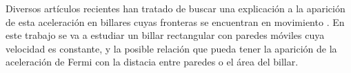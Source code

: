 Diversos artículos recientes han tratado de buscar una explicación a la aparición de esta aceleración en billares cuyas fronteras se encuentran en movimiento \cite{EnergyDifussion,SuppressingFermi, SuppressingFermi2, ReferenciaProfe, NonAutonomous, ExponentialEnergy, GeneralBilliard, GeneralBilliard2}. En este trabajo se va a estudiar un billar rectangular con paredes móviles cuya velocidad es constante, y la posible relación que pueda tener la aparición de la aceleración de Fermi con la distacia entre paredes o el área del billar.

%